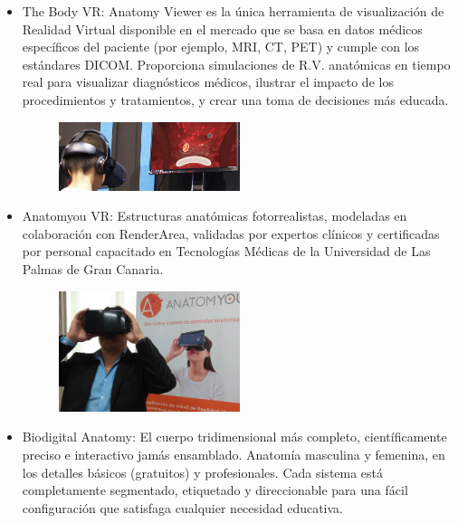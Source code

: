 \begin{itemize}
\item The Body VR: Anatomy Viewer es la única herramienta de visualización de Realidad Virtual disponible en el mercado que se basa en datos médicos específicos del 
paciente (por ejemplo, MRI, CT, PET) y cumple con los estándares DICOM. Proporciona simulaciones de R.V. anatómicas en tiempo real para visualizar diagnósticos médicos, 
ilustrar el impacto de los procedimientos y tratamientos, y crear una toma de decisiones más educada.\
\begin{figure}[H]
	\begin{center}
 		\includegraphics[width = 0.5\textwidth]{source/images/image9.png}
	\end{center} 
\end{figure}
\item Anatomyou VR: Estructuras anatómicas fotorrealistas, modeladas en colaboración con RenderArea, validadas por expertos clínicos y certificadas por personal capacitado 
en  Tecnologías Médicas de la Universidad de Las Palmas de Gran Canaria.
\begin{figure}[H]
	\begin{center}
 		\includegraphics[width = 0.5\textwidth]{source/images/image59.png}
	\end{center} 
\end{figure}
\item Biodigital Anatomy: El cuerpo tridimensional más completo, científicamente preciso e interactivo jamás ensamblado. Anatomía masculina y femenina, en los detalles 
básicos (gratuitos) y profesionales. Cada sistema está completamente segmentado, etiquetado y direccionable para una fácil configuración que satisfaga cualquier necesidad educativa.

\end{itemize}

